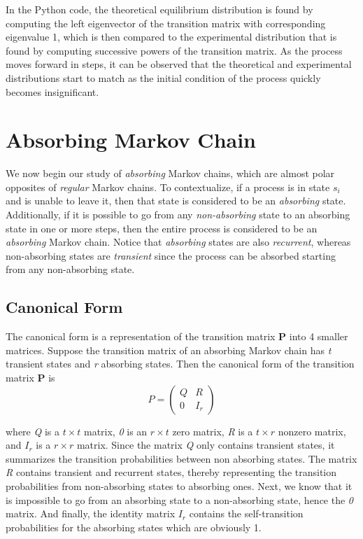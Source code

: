 \documentclass[a4paper, 12pt]{article}
\begin{document}
In the Python code, the theoretical equilibrium distribution is found by computing the left eigenvector of the transition matrix with corresponding eigenvalue 1, which is then compared to the experimental distribution that is found by computing successive powers of the transition matrix. As the process moves forward in steps, it can be observed that the theoretical and experimental distributions start to match as the initial condition of the process quickly becomes insignificant.

\section*{Absorbing Markov Chain}

	We now begin our study of \textit{absorbing} Markov chains, which are almost polar opposites of \textit{regular} Markov chains. To contextualize, if a process is in state $s_i$ and is unable to leave it, then that state is considered to be an \emph{absorbing} state. Additionally, if it is possible to go from any \textit{non-absorbing} state to an absorbing state in one or more steps, then the entire process is considered to be an \emph{absorbing} Markov chain. Notice that \textit{absorbing} states are also \textit{recurrent}, whereas non-absorbing states are \textit{transient} since the process can be absorbed starting from any non-absorbing state.	
	
	\subsection*{Canonical Form}
	
The canonical form is a representation of the transition matrix \textbf{P} into 4 smaller matrices. Suppose the transition matrix of an absorbing Markov chain has \textit{t} transient states and \textit{r} absorbing states. Then the canonical form of the transition matrix \textbf{P} is
	 \[
    P = \left(
    \begin{array}{c|c}
      Q & R\\
      \hline
      0 & I_r
    \end{array}
    \right)
  \]
  
where \textit{Q} is a $t \times t$ matrix, \textit{0} is an $r \times t$ zero matrix, \textit{R} is a $t \times r$ nonzero matrix, and $I_r$ is a $r \times r$ matrix. Since the matrix \textit{Q} only contains transient states, it summarizes the transition probabilities between non absorbing states. The matrix \textit{R} contains transient and recurrent states, thereby representing the transition probabilities from non-absorbing states to absorbing ones. Next, we know that it is impossible to go from an absorbing state to a non-absorbing state, hence the \textit{0} matrix. And finally, the identity matrix $I_r$ contains the self-transition probabilities for the absorbing states which are obviously 1.
\end{document}
